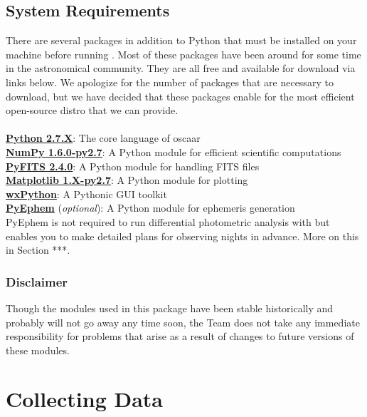 \documentclass[a4paper]{article}
\begin{document}
\subsection{System Requirements} \label{sec:systemRequirements}

There are several packages in addition to Python that must be installed on your machine before running \oscaar. Most of these packages have been around for some time in the astronomical community. They are all free and available for download via links below. We apologize for the number of packages that are necessary to download, but we have decided that these packages enable for the most efficient open-source distro that we can provide.  \\ \\
\noindent
\indent \href{http://www.python.org/getit/}{\textbf{Python 2.7.X}}: The core language of oscaar \\
\indent \href{http://new.scipy.org/download.html}{\textbf{NumPy 1.6.0-py2.7}}: A Python module for efficient scientific computations \\
\indent \href{http://www.stsci.edu/resources/software_hardware/pyfits/}{\textbf{PyFITS 2.4.0}}: A Python module for handling FITS files \\
\indent \href{http://matplotlib.sourceforge.net/index.html}{\textbf{Matplotlib 1.X-py2.7}}: A Python module for plotting\\
\indent \href{http://www.wxpython.org/download.php#stable}{\textbf{wxPython}}: A Pythonic GUI toolkit \\
\indent \href{http://rhodesmill.org/pyephem/}{\textbf{PyEphem}} (\textit{optional}): A Python module for ephemeris generation \\

\noindent
PyEphem is not required to run differential photometric analysis with \oscaar but enables you to make detailed plans for observing nights in advance. More on this in Section ***.%

\subsubsection{Disclaimer}

Though the modules used in this package have been stable historically and probably will not go away any time soon, the \oscaar Team does not take any immediate responsibility for problems that arise as a result of changes to future versions of these modules. 

\section{Collecting Data} \label{sec:collectingData}
\end{document}
